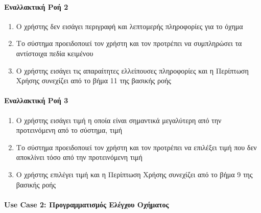 \documentclass{../ol-softwaremanual}
\begin{document}
	\paragraph{Εναλλακτική Ροή 2}
	
	\begin{enumerate}
		\item Ο χρήστης δεν εισάγει περιγραφή και λεπτομερής πληροφορίες για το όχημα
		\item Το σύστημα προειδοποιεί τον χρήστη και τον προτρέπει να συμπληρώσει τα αντίστοιχα πεδία κειμένου
		\item Ο χρήστης εισάγει τις απαραίτητες ελλείπουσες πληροφορίες και η Περίπτωση Χρήσης συνεχίζει από το βήμα 11 της βασικής ροής
	\end{enumerate}
	
	\paragraph{Εναλλακτική Ροή 3}
	
	\begin{enumerate}
		\item Ο χρήστης εισάγει τιμή η οποία είναι σημαντικά μεγαλύτερη από την προτεινόμενη από το σύστημα, τιμή
		\item Το σύστημα προειδοποιεί τον χρήστη και τον προτρέπει να επιλέξει τιμή που δεν αποκλίνει τόσο από την προτεινόμενη τιμή
		\item Ο χρήστης επιλέγει τιμή και η Περίπτωση Χρήσης συνεχίζει από το βήμα 9 της βασικής ροής
	\end{enumerate}
	
	
	\paragraph{\en Use Case 2: \gr Προγραμματισμός Ελέγχου Οχήματος}
	
\end{document}
